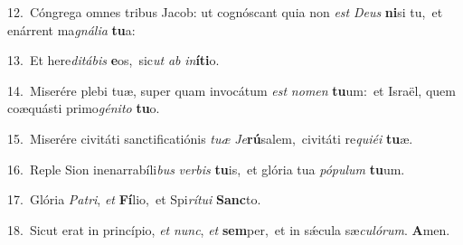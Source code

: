 {\numbfont\textcolor{\numbcolor}{12.}}~Cóngrega omnes tribus Jacob: ut cognóscant quia non \textit{est} \textit{De}\-\textit{us} \textbf{ni}\-si tu,~\star et enárrent ma\-\textit{gná}\-\textit{li}\textit{a} \textbf{tu}\-a:\par
{\numbfont\textcolor{\numbcolor}{13.}}~Et here\-\textit{di}\-\textit{tá}\textit{bis} \textbf{e}\-os,~\star sic\textit{ut} \textit{ab} \textit{in}\-\textbf{í}\textbf{ti}o.\par
{\numbfont\textcolor{\numbcolor}{14.}}~Miserére plebi tuæ, super quam invocátum \textit{est} \textit{no}\-\textit{men} \textbf{tu}\-um:~\star et Israël, quem coæquásti primo\-\textit{gé}\-\textit{ni}\textit{to} \textbf{tu}\-o.\par
{\numbfont\textcolor{\numbcolor}{15.}}~Miserére civitáti sanctificatiónis \textit{tu}\-\textit{æ} \textit{Je}\-\textbf{rú}salem,~\star civitáti re\-\textit{qui}\-\textit{é}\textit{i} \textbf{tu}\-æ.\par
{\numbfont\textcolor{\numbcolor}{16.}}~Reple Sion inenarrabíli\textit{bus} \textit{ver}\-\textit{bis} \textbf{tu}\-is,~\star et glória tua \textit{pó}\-\textit{pu}\textit{lum} \textbf{tu}\-um.\par
{\numbfont\textcolor{\numbcolor}{17.}}~Glória \textit{Pa}\-\textit{tri}, \textit{et} \textbf{Fí}\-lio,~\star et Spi\-\textit{rí}\-\textit{tu}\textit{i} \textbf{Sanc}\-to.\par
{\numbfont\textcolor{\numbcolor}{18.}}~Sicut erat in princípio, \textit{et} \textit{nunc}\-, \textit{et} \textbf{sem}\-per,~\star et in sǽcula sæ\-\textit{cu}\-\textit{ló}\textit{rum}. \textbf{A}\-men.\par
